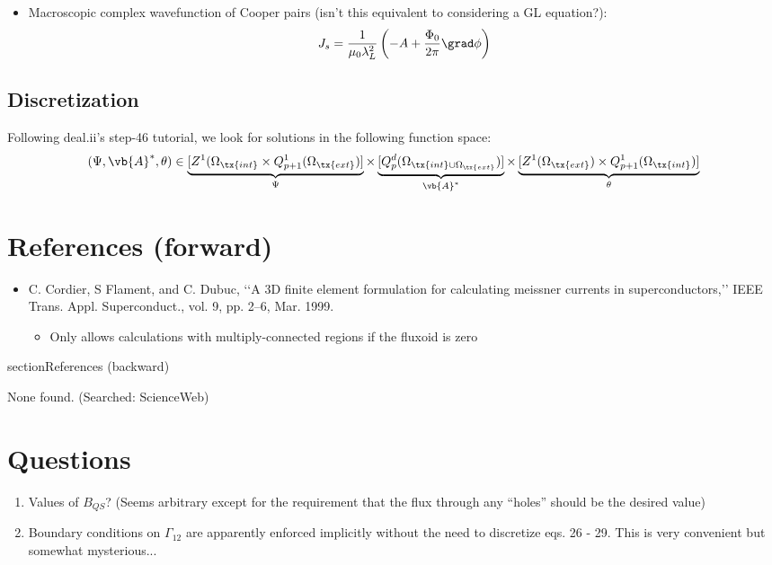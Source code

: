 \documentclass{pset}
\begin{document}
\begin{itemize}
  \item Macroscopic complex wavefunction of Cooper pairs (isn't this equivalent to considering a GL equation?):
    \begin{equation} \label{macro-supercurrent-density}
      J_s = \dfrac{1}{\mu_0 \lambda_L^2} \left( -A + \dfrac{\Phi_0}{2\pi} \grad \phi \right)
    \end{equation}

\end{itemize}

\subsection{Discretization}

Following deal.ii's step-46 tutorial, we look for solutions in the following function space:
\begin{equation} \label{discretization:function-space}
  (\Psi, \vb{A}^*, \theta) \in \underbrace{[Z^1(\Omega_{\tx{int}} \times Q^1_{p + 1}(\Omega_{\tx{ext}}) ]}_{\Psi} \times \underbrace{[Q^d_{p}(\Omega_{\tx{int} \cup \Omega_{\tx{ext}}})]}_{\vb{A}^*} \times \underbrace{[Z^1(\Omega_{\tx{ext}}) \times Q^1_{p + 1}(\Omega_{\tx{int}})]}_{\theta}
\end{equation} \label{discretization:function}


\section{References (forward)}

\begin{itemize}
  \item C. Cordier, S Flament, and C. Dubuc, ‘‘A 3D finite element formulation for calculating meissner currents in superconductors,’’ IEEE Trans.  Appl. Superconduct., vol. 9, pp. 2–6, Mar. 1999.  
    \begin{itemize}
      \item Only allows calculations with multiply-connected regions if the fluxoid is zero
    \end{itemize}
\end{itemize}

section{References (backward)}

None found. (Searched: ScienceWeb)

\section{Questions}

\begin{enumerate}
  \item Values of $\displaystyle B_{QS}$?  (Seems arbitrary except for the requirement that the flux through any ``holes'' should be the desired value)
  \item Boundary conditions on $\displaystyle \Gamma_{12}$ are apparently enforced implicitly without the need to discretize eqs. 26 - 29.  This is very convenient but somewhat mysterious...
\end{enumerate}
\end{document}
